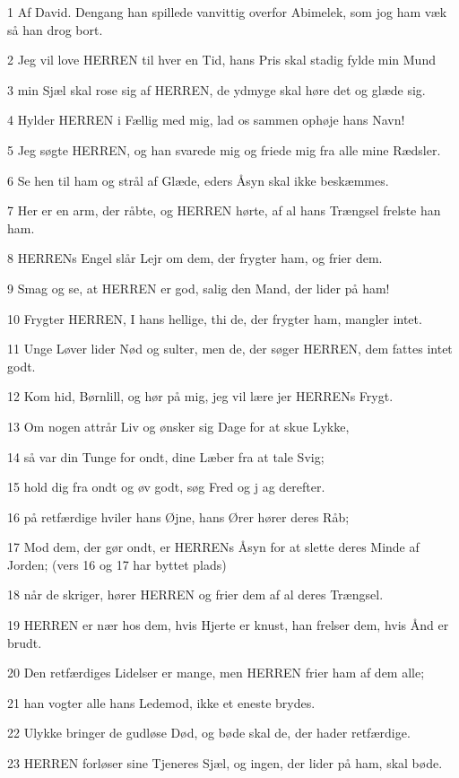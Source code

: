 \par 1 Af David. Dengang han spillede vanvittig overfor Abimelek, som jog ham væk så han drog bort.
\par 2 Jeg vil love HERREN til hver en Tid, hans Pris skal stadig fylde min Mund
\par 3 min Sjæl skal rose sig af HERREN, de ydmyge skal høre det og glæde sig.
\par 4 Hylder HERREN i Fællig med mig, lad os sammen ophøje hans Navn!
\par 5 Jeg søgte HERREN, og han svarede mig og friede mig fra alle mine Rædsler.
\par 6 Se hen til ham og strål af Glæde, eders Åsyn skal ikke beskæmmes.
\par 7 Her er en arm, der råbte, og HERREN hørte, af al hans Trængsel frelste han ham.
\par 8 HERRENs Engel slår Lejr om dem, der frygter ham, og frier dem.
\par 9 Smag og se, at HERREN er god, salig den Mand, der lider på ham!
\par 10 Frygter HERREN, I hans hellige, thi de, der frygter ham, mangler intet.
\par 11 Unge Løver lider Nød og sulter, men de, der søger HERREN, dem fattes intet godt.
\par 12 Kom hid, Børnlill, og hør på mig, jeg vil lære jer HERRENs Frygt.
\par 13 Om nogen attrår Liv og ønsker sig Dage for at skue Lykke,
\par 14 så var din Tunge for ondt, dine Læber fra at tale Svig;
\par 15 hold dig fra ondt og øv godt, søg Fred og j ag derefter.
\par 16 på retfærdige hviler hans Øjne, hans Ører hører deres Råb;
\par 17 Mod dem, der gør ondt, er HERRENs Åsyn for at slette deres Minde af Jorden; (vers 16 og 17 har byttet plads)
\par 18 når de skriger, hører HERREN og frier dem af al deres Trængsel.
\par 19 HERREN er nær hos dem, hvis Hjerte er knust, han frelser dem, hvis Ånd er brudt.
\par 20 Den retfærdiges Lidelser er mange, men HERREN frier ham af dem alle;
\par 21 han vogter alle hans Ledemod, ikke et eneste brydes.
\par 22 Ulykke bringer de gudløse Død, og bøde skal de, der hader retfærdige.
\par 23 HERREN forløser sine Tjeneres Sjæl, og ingen, der lider på ham, skal bøde.

